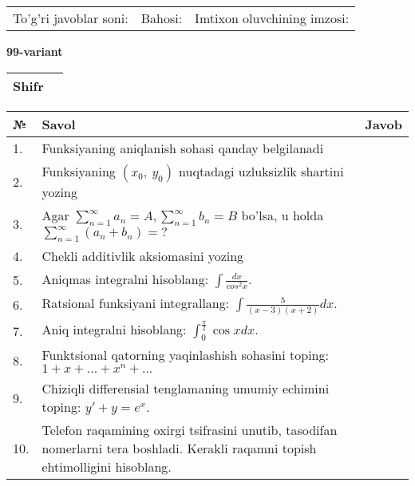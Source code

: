 \documentclass{article}
\begin{document}
  \vspace{1cm}
  
  \begin{tabular}{lll}
  To'g'ri javoblar soni: \underline{\hspace{1.5cm}} & 
  Bahosi: \underline{\hspace{1.5cm}} & 
  Imtixon oluvchining imzosi: \underline{\hspace{2cm}} \\
  \end{tabular}
  
  \egroup
  
  \newpage
  
  
  \textbf{99-variant}\\
  
  \bgroup
  \def\arraystretch{1.6} %
  
  \begin{tabular}{|m{5.7cm}|m{9.5cm}|}
  \hline
  Shifr & \\
  \hline
  \end{tabular}
  
  \vspace{1cm}
  
  \begin{tabular}{|m{0.7cm}|m{10cm}|m{4cm}|}
  \hline
  № & Savol & Javob \\
  \hline
  1. & Funksiyaning aniqlanish sohasi qanday belgilanadi &  \\
  \hline
  2. & Funksiyaning \((x_{0},\ y_{0})\) nuqtadagi uzluksizlik shartini yozing &  \\
  \hline
  3. & Agar \(\sum_{n = 1}^{\infty}a_{n} = A,\sum_{n = 1}^{\infty}b_{n} = B\) bo'lsa, u holda \(\sum_{n = 1}^{\infty}\left( a_{n} + b_{n} \right) = ?\) &  \\
  \hline
  4. & Chekli additivlik aksiomasini yozing &  \\
  \hline
  5. & Aniqmas integralni hisoblang: \(\int \frac{dx}{cos^{2}x}\). &  \\
  \hline
  6. & Ratsional funksiyani integrallang: \(\int {\frac{5}{(x - 3)(x + 2)}dx}\). &  \\
  \hline
  7. & Aniq integralni hisoblang: \(\int_{0}^{\frac{\pi}{2}}{\cos xdx}\). &  \\
  \hline
  8. & Funktsional qatorning yaqinlashish sohasini toping:\(1 + x + ... + x^{n} + ...\) &  \\
  \hline
  9. & Chiziqli differensial tenglamaning umumiy echimini toping: \(y' + y = e^{x}\). &  \\
  \hline
  10. & Telefon raqamining oxirgi tsifrasini unutib, tasodifan nomerlarni tera boshladi. Kerakli raqamni topish ehtimolligini hisoblang. &  \\
  \hline
  \end{tabular}
  
\end{document}
